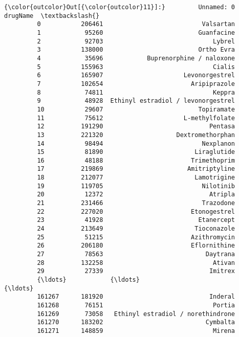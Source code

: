 \documentclass[11pt]{article}
\begin{document}
\begin{Verbatim}[commandchars=\\\{\}]
{\color{outcolor}Out[{\color{outcolor}11}]:}         Unnamed: 0                            drugName  \textbackslash{}
         0           206461                           Valsartan   
         1            95260                          Guanfacine   
         2            92703                              Lybrel   
         3           138000                          Ortho Evra   
         4            35696            Buprenorphine / naloxone   
         5           155963                              Cialis   
         6           165907                      Levonorgestrel   
         7           102654                        Aripiprazole   
         8            74811                              Keppra   
         9            48928  Ethinyl estradiol / levonorgestrel   
         10           29607                          Topiramate   
         11           75612                      L-methylfolate   
         12          191290                             Pentasa   
         13          221320                    Dextromethorphan   
         14           98494                           Nexplanon   
         15           81890                         Liraglutide   
         16           48188                        Trimethoprim   
         17          219869                       Amitriptyline   
         18          212077                         Lamotrigine   
         19          119705                           Nilotinib   
         20           12372                             Atripla   
         21          231466                           Trazodone   
         22          227020                        Etonogestrel   
         23           41928                          Etanercept   
         24          213649                         Tioconazole   
         25           51215                        Azithromycin   
         26          206180                        Eflornithine   
         27           78563                            Daytrana   
         28          132258                              Ativan   
         29           27339                             Imitrex   
         {\ldots}            {\ldots}                                 {\ldots}   
         161267      181920                             Inderal   
         161268       76151                              Portia   
         161269       73058   Ethinyl estradiol / norethindrone   
         161270      183202                            Cymbalta   
         161271      148859                              Mirena   

\end{Verbatim}
\end{document}
